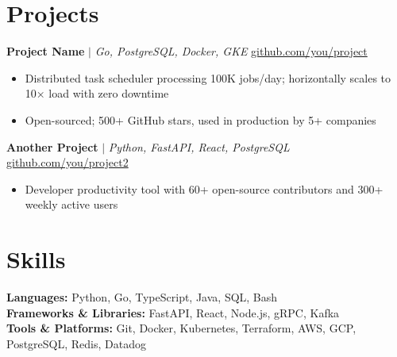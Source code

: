 \documentclass[10pt, letterpaper]{article}
\begin{document}
\section{Projects}

\textbf{Project Name} $|$ \textit{Go, PostgreSQL, Docker, GKE} \hfill \href{https://github.com/you/project}{github.com/you/project}
\begin{itemize}[leftmargin=*, noitemsep, topsep=3pt, parsep=0pt]
  \item Distributed task scheduler processing 100K jobs/day; horizontally scales to 10× load with zero downtime
  \item Open-sourced; 500+ GitHub stars, used in production by 5+ companies
\end{itemize}

\vspace{4pt}
\textbf{Another Project} $|$ \textit{Python, FastAPI, React, PostgreSQL} \hfill \href{https://github.com/you/project2}{github.com/you/project2}
\begin{itemize}[leftmargin=*, noitemsep, topsep=3pt, parsep=0pt]
  \item Developer productivity tool with 60+ open-source contributors and 300+ weekly active users
\end{itemize}

\section{Skills}

\textbf{Languages:} Python, Go, TypeScript, Java, SQL, Bash \\
\textbf{Frameworks \& Libraries:} FastAPI, React, Node.js, gRPC, Kafka \\
\textbf{Tools \& Platforms:} Git, Docker, Kubernetes, Terraform, AWS, GCP, PostgreSQL, Redis, Datadog
\end{document}

